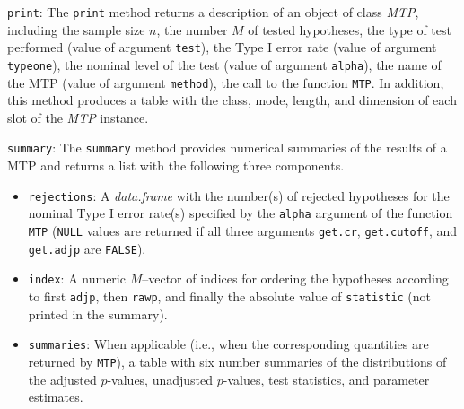 \documentclass[11pt]{article}
\newcommand{\Robject}[1]{\texttt{#1}}
\newcommand{\Rclass}[1]{\textit{#1}}
\begin{document}
\begin{description}

\item{\Robject{print}:} 
The \Robject{print} method returns a description of an object of class \Rclass{MTP}, including 
the sample size $n$,
the number $M$ of tested hypotheses,
the type of test performed (value of argument \Robject{test}), 
the Type I error rate (value of argument \Robject{typeone}),
the nominal level of the test  (value of argument \Robject{alpha}), 
the name of the MTP  (value of argument \Robject{method}), 
the call to the function \Robject{MTP}.
In addition, this method produces a table with the class, mode, length, and dimension of each slot of the \Rclass{MTP} instance. 

\item{\Robject{summary}:} 
The \Robject{summary} method provides numerical summaries of the results of a MTP and returns a list with the following three components.
\begin{itemize}
\item
\Robject{rejections}: 
A \Rclass{data.frame} with the number(s) of rejected hypotheses for the nominal Type I error rate(s) specified by the \Robject{alpha} argument of the function \Robject{MTP} 
(\Robject{NULL} values are returned if all three arguments \Robject{get.cr}, \Robject{get.cutoff}, and \Robject{get.adjp} are \Robject{FALSE}).
\item
\Robject{index}:
A numeric $M$--vector of indices for ordering the hypotheses according to first \Robject{adjp}, then \Robject{rawp}, and finally the absolute value of \Robject{statistic} (not printed in the summary). 
\item
\Robject{summaries}:
When applicable (i.e., when the corresponding quantities are returned by \Robject{MTP}), a table with six number summaries of the distributions of the adjusted $p$-values, unadjusted $p$-values, test statistics, and parameter estimates.
\end{itemize}


\end{description}
\end{document}
